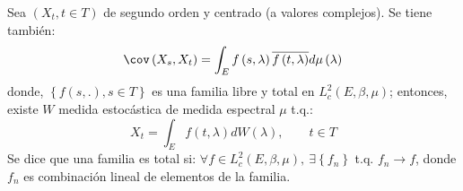 \begin{teorema}
Sea $(X_{t}, t\in T)$ de segundo orden y centrado (a valores complejos). Se tiene tambi\'{e}n:
\[
\cov\left( X_{s},X_{t} \right)=\int_E {f\left( s,\lambda \right)\overline{f\left( 
t,\lambda \right)}d\mu \left( \lambda \right)} 
\]
donde, $\left\{ f\left( s,. \right),s\in T \right\}$ es una familia libre y total en $L_{c}^{2}\left( E,\beta ,\mu \right)$; entonces, existe $W$ medida estoc\'{a}stica de medida espectral $\mu $ t.q.:
\[
X_{t}=\int_E {f\left( t,\lambda \right)dW\left( \lambda \right)},\qquad t\in T
\]
Se dice que una familia es total si: $\forall f\in L_{c}^{2}\left( E,\beta ,\mu \right),\ \exists \left\{ f_{n} \right\}$ t.q. 
$f_{n}\to f$, donde $f_{n}$ es combinaci\'{o}n lineal de elementos de la familia.
\end{teorema}

